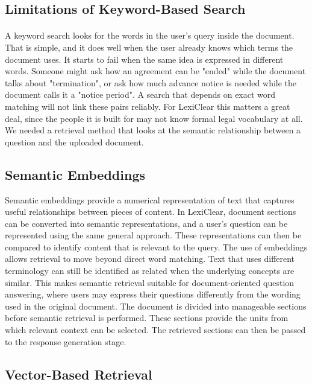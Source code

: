 \documentclass[12pt,a4paper,oneside]{report}
\begin{document}
\subsection{Limitations of Keyword-Based Search}

\paragraph{} A keyword search looks for the words in the user's query inside the document. That is simple, and it does well when the user already knows which terms the document uses. It starts to fail when the same idea is expressed in different words. Someone might ask how an agreement can be "ended" while the document talks about "termination", or ask how much advance notice is needed while the document calls it a "notice period". A search that depends on exact word matching will not link these pairs reliably. For LexiClear this matters a great deal, since the people it is built for may not know formal legal vocabulary at all. We needed a retrieval method that looks at the semantic relationship between a question and the uploaded document.

\subsection{Semantic Embeddings}

Semantic embeddings provide a numerical representation of text that captures
useful relationships between pieces of content. In LexiClear, document
sections can be converted into semantic representations, and a user's
question can be represented using the same general approach. These
representations can then be compared to identify content that is relevant to
the query. The use of embeddings allows retrieval to move beyond direct word matching.
Text that uses different terminology can still be identified as related when
the underlying concepts are similar. This makes semantic retrieval suitable
for document-oriented question answering, where users may express their
questions differently from the wording used in the original document. The document is divided into manageable sections before semantic retrieval
is performed. These sections provide the units from which relevant context
can be selected. The retrieved sections can then be passed to the response
generation stage.

\subsection{Vector-Based Retrieval}
\end{document}
